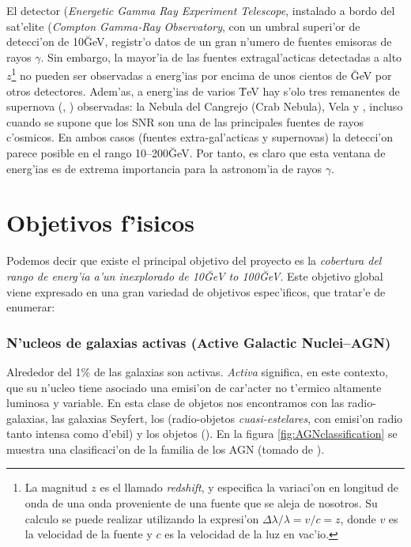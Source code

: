 El detector  (\emph{Energetic Gamma Ray Experiment
  Telescope}, instalado a bordo del sat'elite  (\emph{Compton
  Gamma-Ray Observatory}, con un umbral superi'or de detecci'on de
10\u{GeV}, registr'o datos de un gran n'umero de fuentes emisoras de
rayos $\gamma$. Sin embargo, la mayor'ia de las fuentes
extragal'acticas detectadas a alto %
%
$z$\footnote{La magnitud $z$ es el llamado \emph{redshift}, y
  especifica la variaci'on en longitud de onda de una onda proveniente
  de una fuente que se aleja de nosotros. Su calculo se puede realizar
  utilizando la expresi'on $\Delta\lambda/\lambda=v/c=z$, donde $v$ es
la velocidad de la fuente y $c$ es la velocidad de la luz en vac'io.}%
%
no pueden ser observadas a energ'ias por encima de unos cientos de
\u{GeV} por otros detectores. Adem'as, a energ'ias de varios \u{TeV}
hay s'olo tres remanentes de supernova (\emph{}, ) observadas: la Nebula del Cangrejo (Crab
Nebula), Vela y \I{SN\,1006}, incluso cuando se supone que los SNR son
una de las principales fuentes de rayos c'osmicos. En ambos casos
(fuentes extra-gal'acticas y supernovas) la detecci'on parece posible
en el rango 10--200\u{GeV}. Por tanto, es claro que esta ventana de
energ'ias es de extrema importancia para la astronom'ia de rayos
$\gamma$.

\CGROenergiesfig

\section{Objetivos f'isicos}
%
Podemos decir que existe el principal objetivo del proyecto \MAGIC es
la \emph{cobertura del rango de energ'ia a'un inexplorado de 10\u{GeV}
to 100\u{GeV}}. Este objetivo global viene expresado en una gran
variedad de objetivos espec'ificos, que tratar'e de enumerar:

\subsubsection*{N'ucleos de galaxias activas (Active Galactic 
Nuclei--AGN)}
%
Alrededor del 1\% de las galaxias son activas. \emph{Activa}
significa, en este contexto, que su n'ucleo tiene asociado una
emisi'on de car'acter no t'ermico altamente luminosa y variable.  En
esta clase de objetos nos encontramos con las radio-galaxias, las
galaxias Seyfert, los \emph{\I{cuasares}} (radio-objetos
\emph{cuasi-estelares}, con emisi'on radio tanto intensa como d'ebil)
y los objetos \emph{\I{BL-Lacert\ae}} (\I{BL-Lac}). En la figura
\ref{fig:AGNclassification} se muestra una clasificaci'on de la
familia de los AGN (tomado de \cite{Petry:tesis}).

